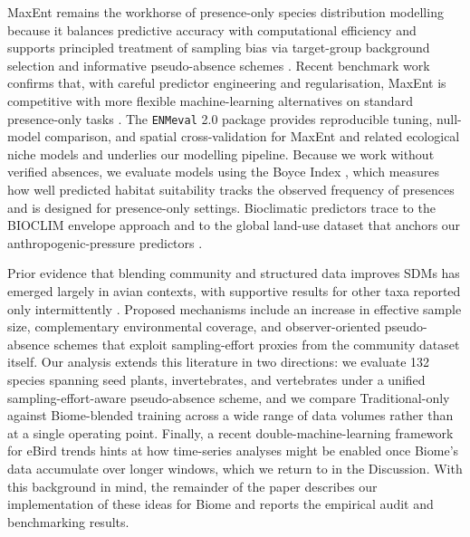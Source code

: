 \documentclass[11pt]{article}
\begin{document}
MaxEnt remains the workhorse of presence-only species distribution modelling because it balances predictive accuracy with computational efficiency and supports principled treatment of sampling bias via target-group background selection and informative pseudo-absence schemes \citep{phillips2006maxent,phillips2008maxentextensions,phillips2009samplebias,elith2011statistical}. Recent benchmark work confirms that, with careful predictor engineering and regularisation, MaxEnt is competitive with more flexible machine-learning alternatives on standard presence-only tasks \citep{valavi2022predictive}. The \texttt{ENMeval} 2.0 package \citep{kass2021enmeval} provides reproducible tuning, null-model comparison, and spatial cross-validation for MaxEnt and related ecological niche models and underlies our modelling pipeline. Because we work without verified absences, we evaluate models using the Boyce Index \citep{hirzel2006boyce}, which measures how well predicted habitat suitability tracks the observed frequency of presences and is designed for presence-only settings. Bioclimatic predictors trace to the BIOCLIM envelope approach \citep{booth2014bioclim} and to the global land-use dataset that anchors our anthropogenic-pressure predictors \citep{newbold2015land}.

Prior evidence that blending community and structured data improves SDMs has emerged largely in avian contexts, with supportive results for other taxa reported only intermittently \citep{johnston2018estimates,johnston2021analytical,robinson2020integrating,steen2019stringent,milanesi2020observer,feldman2021trends}. Proposed mechanisms include an increase in effective sample size, complementary environmental coverage, and observer-oriented pseudo-absence schemes that exploit sampling-effort proxies from the community dataset itself. Our analysis extends this literature in two directions: we evaluate 132 species spanning seed plants, invertebrates, and vertebrates under a unified sampling-effort-aware pseudo-absence scheme, and we compare Traditional-only against Biome-blended training across a wide range of data volumes rather than at a single operating point. Finally, a recent double-machine-learning framework for eBird trends \citep{fink2023double} hints at how time-series analyses might be enabled once Biome's data accumulate over longer windows, which we return to in the Discussion. With this background in mind, the remainder of the paper describes our implementation of these ideas for Biome and reports the empirical audit and benchmarking results.
\end{document}
